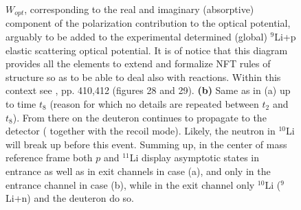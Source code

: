 \begin{figure}
{    	    	 $W_{opt}$, corresponding to  the real and imaginary (absorptive) component of the polarization contribution to the  optical potential, arguably to be added to  the experimental determined (global)
    	    	 $^9$Li+p elastic scattering optical potential. It is of notice that this  diagram provides all the elements to extend and  formalize 
    	    	 NFT rules of structure so as to be able to deal also with reactions. Within this context
    	    	 see \cite{BrogliaandWinther1991}, pp. 410,412 (figures 28 and 29). 
    	    	 {\bf (b)} Same as in (a)  up to time $t_8$ (reason for which no  details are repeated between $t_2$ and $t_8$). From there on  the deuteron continues  to propagate  to the detector ( together with the recoil mode). Likely,  the neutron in $^{10}$Li will break up before  this event. 
    	    	 Summing up, in the center of mass reference frame both $p$ and $^{11}$Li display asymptotic states in entrance as well as in exit channels in case (a), and only in the entrance channel in case (b), while in the exit channel only $^{10}$Li ($^9$Li+n) and the deuteron do so. }\label{fig6.6.4}
    \end{figure}
